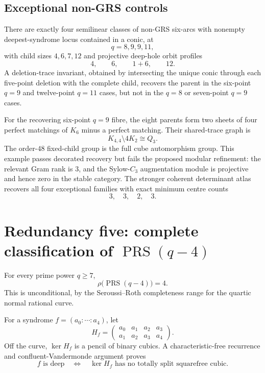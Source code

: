 \documentclass[11pt]{article}
\newcommand{\PRS}{\operatorname{PRS}}
\begin{document}
\subsection{Exceptional non-GRS controls}

There are exactly four semilinear classes of non-GRS six-arcs with
nonempty deepest-syndrome locus contained in a conic, at
\[
 q=8,9,9,11,
\]
with child sizes $4,6,7,12$ and projective deep-hole orbit profiles
\[
 4,\qquad6,\qquad1+6,\qquad12.
\]
A deletion-trace invariant, obtained by intersecting the unique conic
through each five-point deletion with the complete child, recovers the
parent in the six-point $q=9$ and twelve-point $q=11$ cases, but not in
the $q=8$ or seven-point $q=9$ cases.

For the recovering six-point $q=9$ fibre, the eight parents form two
sheets of four perfect matchings of $K_6$ minus a perfect matching.  Their
shared-trace graph is
\[
 K_{4,4}\setminus4K_2\cong Q_3.
\]
The order-$48$ fixed-child group is the full cube automorphism group.  This
example passes decorated recovery but fails the proposed modular
refinement: the relevant Gram rank is $3$, and the Sylow-$C_3$
augmentation module is projective and hence zero in the stable category.
The stronger coherent determinant atlas recovers all four exceptional
families with exact minimum centre counts
\[
 3,\quad3,\quad2,\quad3.
\]

\section{Redundancy five: complete classification of \texorpdfstring{$\PRS(q-4)$}{PRS(q-4)}}

For every prime power $q\geq7$,
\[
 \rho\bigl(\PRS(q-4)\bigr)=4.
\]
This is unconditional, by the Seroussi--Roth completeness range for the
quartic normal rational curve.

For a syndrome $f=(a_0:\cdots:a_4)$, let
\[
 H_f=
 \begin{pmatrix}
 a_0&a_1&a_2&a_3\\
 a_1&a_2&a_3&a_4
 \end{pmatrix}.
\]
Off the curve, $\ker H_f$ is a pencil of binary cubics.  A
characteristic-free recurrence and confluent-Vandermonde argument proves
\[
 f\text{ is deep}
 \quad\Longleftrightarrow\quad
 \ker H_f\text{ has no totally split squarefree cubic}.
\]
\end{document}
